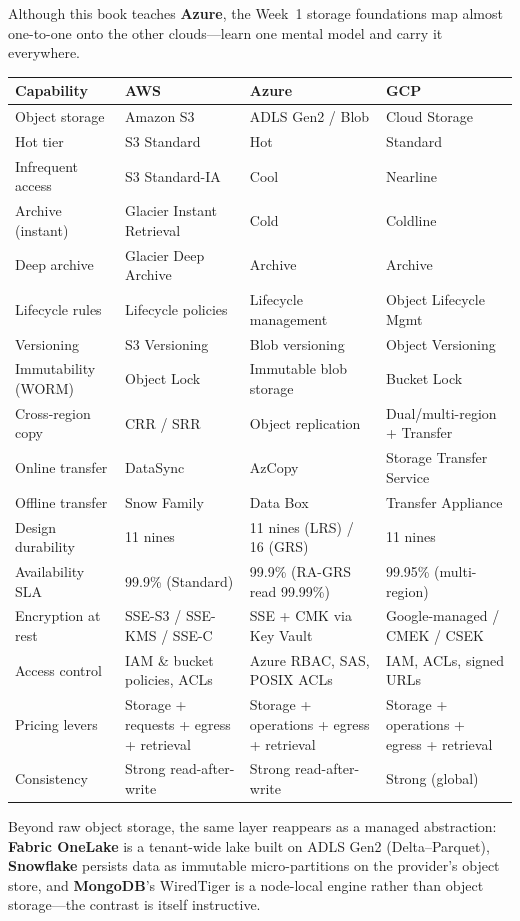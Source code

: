\begin{crosscloud}
Although this book teaches \textbf{Azure}, the Week~1 storage foundations map almost one-to-one onto the other clouds---learn one mental model and carry it everywhere.

\vspace{2mm}
{\footnotesize
\begin{tabular}{@{}p{2.8cm}p{3.0cm}p{3.0cm}p{3.0cm}@{}}
\toprule
\textbf{Capability} & \textbf{AWS} & \textbf{Azure} & \textbf{GCP} \\
\midrule
Object storage & Amazon S3 & ADLS Gen2 / Blob & Cloud Storage \\
Hot tier & S3 Standard & Hot & Standard \\
Infrequent access & S3 Standard-IA & Cool & Nearline \\
Archive (instant) & Glacier Instant Retrieval & Cold & Coldline \\
Deep archive & Glacier Deep Archive & Archive & Archive \\
Lifecycle rules & Lifecycle policies & Lifecycle management & Object Lifecycle Mgmt \\
Versioning & S3 Versioning & Blob versioning & Object Versioning \\
Immutability (WORM) & Object Lock & Immutable blob storage & Bucket Lock \\
Cross-region copy & CRR / SRR & Object replication & Dual/multi-region + Transfer \\
Online transfer & DataSync & AzCopy & Storage Transfer Service \\
Offline transfer & Snow Family & Data Box & Transfer Appliance \\
\addlinespace
Design durability & 11 nines & 11 nines (LRS) / 16 (GRS) & 11 nines \\
Availability SLA & 99.9\% (Standard) & 99.9\% (RA-GRS read 99.99\%) & 99.95\% (multi-region) \\
Encryption at rest & SSE-S3 / SSE-KMS / SSE-C & SSE + CMK via Key Vault & Google-managed / CMEK / CSEK \\
Access control & IAM \& bucket policies, ACLs & Azure RBAC, SAS, POSIX ACLs & IAM, ACLs, signed URLs \\
Pricing levers & Storage + requests + egress + retrieval & Storage + operations + egress + retrieval & Storage + operations + egress + retrieval \\
Consistency & Strong read-after-write & Strong read-after-write & Strong (global) \\
\bottomrule
\end{tabular}}

\vspace{1mm}
Beyond raw object storage, the same layer reappears as a managed abstraction: \textbf{Fabric OneLake} is a tenant-wide lake built on ADLS Gen2 (Delta--Parquet), \textbf{Snowflake} persists data as immutable micro-partitions on the provider's object store, and \textbf{MongoDB}'s WiredTiger is a node-local engine rather than object storage---the contrast is itself instructive.
\end{crosscloud}

